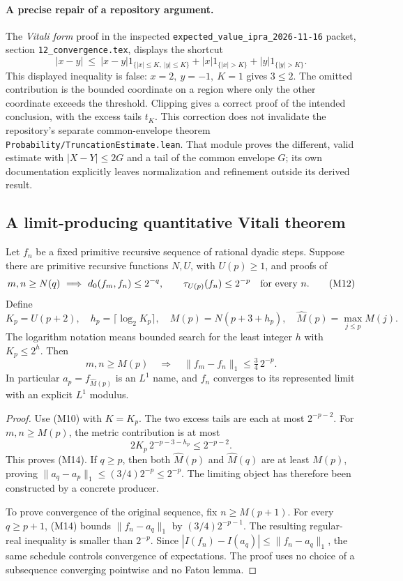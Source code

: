 \paragraph{A precise repair of a repository argument.}
The \emph{Vitali form} proof in the inspected
\texttt{expected\_value\_ipra\_2026-11-16} packet, section
\texttt{12\_convergence.tex}, displays the shortcut
\[
 |x-y|\ \le\
 |x-y|1_{\{|x|\le K,\ |y|\le K\}}
 +|x|1_{\{|x|>K\}}+|y|1_{\{|y|>K\}}.
 \tag{M11}
\]
This displayed inequality is false: \(x=2,\ y=-1,\ K=1\) gives \(3\le2\).
The omitted contribution is the bounded coordinate on a region where only
the other coordinate exceeds the threshold.  Clipping gives a correct proof
of the intended conclusion, with the excess tails \(t_K\).  This correction
does not invalidate the repository's separate common-envelope theorem
\texttt{Probability/TruncationEstimate.lean}.  That module proves the
different, valid estimate with \(|X-Y|\le2G\) and a tail of the common
envelope \(G\); its own documentation explicitly leaves normalization and
refinement outside its derived result.

\subsection{A limit-producing quantitative Vitali theorem}

\begin{theorem}\label{m:vitali_cauchy}
Let \(f_n\) be a fixed primitive recursive sequence of rational dyadic
steps.  Suppose there are primitive recursive functions \(N,U\), with
\(U(p)\ge1\), and proofs of
\[
 m,n\ge N(q)\ \Longrightarrow\ d_0(f_m,f_n)\le2^{-q},
 \qquad
 \tau_{U(p)}(f_n)\le2^{-p}\quad\hbox{for every }n.
 \tag{M12}
\]
Define
\[
 K_p=U(p+2),\quad
 h_p=\lceil\log_2 K_p\rceil,\quad
 M(p)=N(p+3+h_p),\quad
 \widehat M(p)=\max_{j\le p}M(j).
 \tag{M13}
\]
The logarithm notation means bounded search for the least integer \(h\)
with \(K_p\le2^h\).  Then
\[
 m,n\ge M(p)\quad\Longrightarrow\quad
 \|f_m-f_n\|_1\le\tfrac34\,2^{-p}.
 \tag{M14}
\]
In particular \(a_p=f_{\widehat M(p)}\) is an \(L^1\) name, and
\(f_n\) converges to its represented limit with an explicit \(L^1\) modulus.
\end{theorem}

\begin{proof}
Use (M10) with \(K=K_p\).  The two excess tails are each at most
\(2^{-p-2}\).  For \(m,n\ge M(p)\), the metric contribution is at most
\[
 2K_p\,2^{-p-3-h_p}\le2^{-p-2}.
 \]
This proves (M14).  If \(q\ge p\), then both
\(\widehat M(p)\) and \(\widehat M(q)\) are at least \(M(p)\), proving
\(\|a_q-a_p\|_1\le(3/4)2^{-p}\le2^{-p}\).
The limiting object has therefore been constructed by a concrete producer.

To prove convergence of the original sequence, fix \(n\ge M(p+1)\).
For every \(q\ge p+1\), (M14) bounds
\(\|f_n-a_q\|_1\) by \((3/4)2^{-p-1}\).
The resulting regular-real inequality is smaller than \(2^{-p}\).
Since \(|I(f_n)-I(a_q)|\le\|f_n-a_q\|_1\), the same schedule controls
convergence of expectations.  The proof uses no choice of a subsequence
converging pointwise and no Fatou lemma.
\end{proof}

